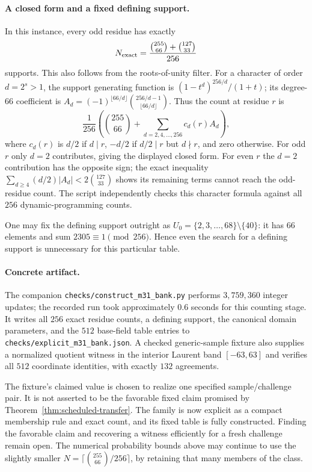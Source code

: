 \documentclass[11pt,letterpaper]{article}
\theoremstyle{definition}
\theoremstyle{remark}
\begin{document}
\paragraph{A closed form and a fixed defining support.}
In this instance, every odd residue has exactly
\[
 N_{\rm exact}=\frac{\binom{255}{66}+\binom{127}{33}}{256}
\]
supports. This also follows from the roots-of-unity filter. For a
character of order $d=2^s>1$, the support generating function is
$(1-t^d)^{256/d}/(1+t)$; its degree-$66$ coefficient is
$A_d=(-1)^{\lfloor66/d\rfloor}\binom{256/d-1}{\lfloor66/d\rfloor}$.
Thus the count at residue $r$ is
\[
 \frac1{256}\left(\binom{255}{66}
      +\sum_{d=2,4,\ldots,256}c_d(r)A_d\right),
\]
where $c_d(r)$ is $d/2$ if $d\mid r$, $-d/2$ if $d/2\mid r$ but
$d\nmid r$, and zero otherwise. For odd $r$ only $d=2$ contributes,
giving the displayed closed form. For even $r$ the $d=2$ contribution
has the opposite sign; the exact inequality
$\sum_{d\ge4}(d/2)|A_d|<2\binom{127}{33}$ shows its remaining terms
cannot reach the odd-residue count. The script independently checks
this character formula against all $256$ dynamic-programming counts.

One may fix the defining support outright as
$U_0=\{2,3,\ldots,68\}\setminus\{40\}$: it has $66$ elements
and sum $2305\equiv1\pmod{256}$. Hence even the search for a
defining support is unnecessary for this particular table.

\paragraph{Concrete artifact.}
The companion \texttt{checks/construct\_m31\_bank.py} performs
$3{,}759{,}360$ integer updates; the recorded run took approximately
$0.6$ seconds for this counting stage. It writes all $256$ exact
residue counts, a defining support, the canonical domain parameters,
and the $512$ base-field table entries to
\texttt{checks/explicit\_m31\_bank.json}. A checked generic-sample
fixture also supplies a normalized quotient witness in the interior
Laurent band $[-63,63]$ and verifies all $512$ coordinate identities,
with exactly $132$ agreements.

The fixture's claimed value is chosen to realize one specified
sample/challenge pair. It is not asserted to be the favorable fixed
claim promised by Theorem~\ref{thm:scheduled-transfer}. The family is
now explicit as a compact membership rule and exact count, and its
fixed table is fully constructed. Finding the favorable claim and
recovering a witness efficiently for a fresh challenge remain open.
The numerical probability bounds above may continue to use the
slightly smaller $N=\lceil\binom{255}{66}/256\rceil$, by retaining
that many members of the class.
\end{document}
